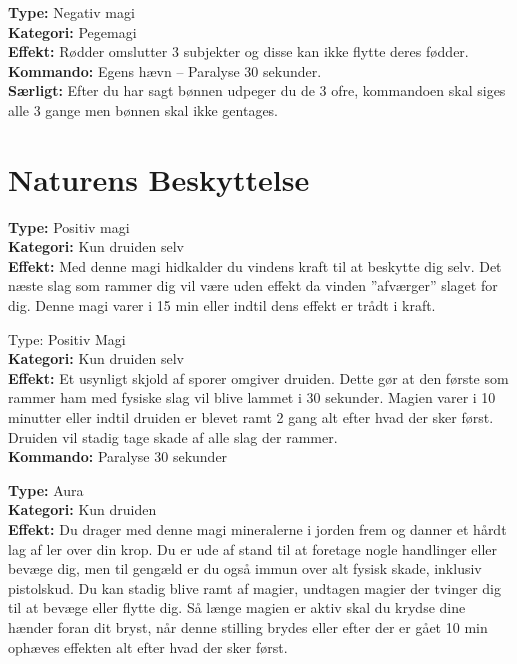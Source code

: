 \begin{jord*}
\textbf{Type:} Negativ magi\\ 
\textbf{Kategori:} Pegemagi\\
\textbf{Effekt:} Rødder omslutter 3 subjekter og disse kan ikke flytte deres fødder.\\
\textbf{Kommando:} Egens hævn – Paralyse 30 sekunder.\\
\textbf{Særligt:} Efter du har sagt bønnen udpeger du de 3 ofre, kommandoen skal siges alle 3 gange men bønnen skal ikke gentages.
\end{jord*}
\newpage
\section*{Naturens Beskyttelse}

\begin{nBeskyt*}
\textbf{Type:} Positiv magi\\ 
\textbf{Kategori:} Kun druiden selv\\
\textbf{Effekt:} Med denne magi hidkalder du vindens kraft til at beskytte dig selv. Det næste slag som rammer dig vil være uden effekt da vinden ”afværger” slaget for dig. Denne magi varer i 15 min eller indtil dens effekt er trådt i kraft.
\end{nBeskyt*}

\begin{nBeskyt*}[Pollenskjold]
Type: Positiv Magi  \\
\textbf{Kategori:} Kun druiden selv\\
\textbf{Effekt:} Et usynligt skjold af sporer omgiver druiden. Dette gør at den første som rammer ham med fysiske slag vil blive lammet i 30 sekunder. Magien varer i 10 minutter eller indtil druiden er blevet ramt 2 gang alt efter hvad der sker først. Druiden vil stadig tage skade af alle slag der rammer.\\
\textbf{Kommando:} Paralyse 30 sekunder
\end{nBeskyt*}

\begin{nBeskyt*}[Lerform]
\textbf{Type:} Aura\\ 
\textbf{Kategori:} Kun druiden\\
\textbf{Effekt:} Du drager med denne magi mineralerne i jorden frem og danner et hårdt lag af ler over din krop. Du er ude af stand til at foretage nogle handlinger eller bevæge dig, men til gengæld er du også immun over
alt fysisk skade, inklusiv pistolskud. Du kan stadig blive ramt af magier, undtagen magier der tvinger dig til at bevæge eller flytte dig. Så længe magien er aktiv skal du krydse dine hænder foran dit bryst, når denne stilling brydes eller efter der er gået 10 min ophæves effekten alt efter hvad der sker først.
\end{nBeskyt*}

